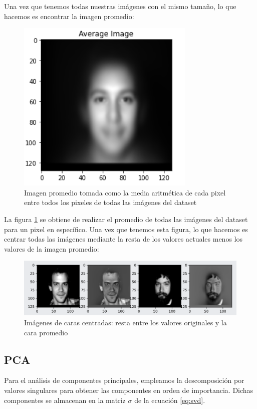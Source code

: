 \documentclass[conference]{IEEEtran}
\begin{document}
Una vez que tenemos todas nuestras imágenes con el mismo tamaño, lo que hacemos es encontrar la imagen promedio:

\begin{figure}[H]
    \centering
    \includegraphics[scale=0.25]{imgs/avg_img.png}
    \caption{Imagen promedio tomada como la media aritmética de cada pixel entre todos los pixeles de todas las imágenes del dataset}
    \label{fig:avg_face}
\end{figure}

La figura \ref{fig:avg_face} se obtiene de realizar el promedio de todas las imágenes del dataset para un pixel en específico. Una vez que tenemos esta figura, lo que hacemos es centrar todas las imágenes mediante la resta de los valores actuales menos los valores de la imagen promedio: 

\begin{figure}[H]
    \centering
    \includegraphics[scale=0.2]{imgs/centered_images_avg.png}
    \caption{Imágenes de caras centradas: resta entre los valores originales y la cara promedio}
    \label{fig:imgs_minus_avg}
\end{figure}

\subsection{PCA}
Para el análisis de componentes principales, empleamos la descomposición por valores singulares para obtener las componentes en orden de importancia. Dichas componentes se almacenan en la matriz $\sigma$ de la ecuación \ref{eq:svd}. 
\end{document}
